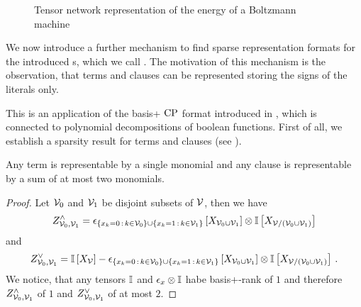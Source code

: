 \begin{figure}[t]
    \begin{center}
        
    \end{center}
    \caption{Tensor network representation of the energy of a Boltzmann machine}
    \label{fig:boltzmannEnergy}
\end{figure}

\subsect{\PolynomialSparsity{}}\label{sec:HLNpolyRepresentation}

We now introduce a further mechanism to find sparse representation formats for the introduced \HybridLogicNetwork{}s, which we call \polynomialSparsity{}.
The motivation of this mechanism is the observation, that terms and clauses can be represented storing the signs of the literals only.

This is an application of the basis+ $\mathrm{CP}$ format introduced in , which is connected to polynomial decompositions of boolean functions.
First of all, we establish a sparsity result for terms and clauses (see ).

\begin{lemma}
    \label{lem:clauseTermBasisPlus}
    Any term is representable by a single monomial and any clause is representable by a sum of at most two monomials. %
\end{lemma}
\begin{proof}
    Let $\mathcal{V}_0$ and $\mathcal{V}_1$ be disjoint subsets of $\mathcal{V}$, then we have
    \begin{align*}
        Z^{\land}_{\mathcal{V}_0,\mathcal{V}_1} = \epsilon_{
            \{x_{k} = 0 \,:\, k\in\mathcal{V}_0\} \cup \{x_{k} = 1 \,:\, k\in\mathcal{V}_1\}
        }\left[X_{\mathcal{V}_0\cup\mathcal{V}_1}\right] \otimes \mathbb{I}\left[X_{\mathcal{V}/(\mathcal{V}_0\cup\mathcal{V}_1)}\right]
    \end{align*}
    and
    \begin{align*}
        Z^{\lor}_{\mathcal{V}_0,\mathcal{V}_1} = \mathbb{I}\left[X_{\mathcal{V}}\right] - \epsilon_{
            \{x_{k} = 0 \,:\, k\in\mathcal{V}_0\} \cup \{x_{k} = 1 \,:\, k\in\mathcal{V}_1\}
        }\left[X_{\mathcal{V}_0\cup\mathcal{V}_1}\right]
        \otimes \mathbb{I}\left[X_{\mathcal{V}/(\mathcal{V}_0\cup\mathcal{V}_1)}\right] \, .
    \end{align*}
    We notice, that any tensors $\mathbb{I}$ and $\epsilon_{x}\otimes \mathbb{I}$ habe basis+-rank of $1$ and therefore $Z^{\land}_{\mathcal{V}_0,\mathcal{V}_1}$ of $1$ and $Z^{\lor}_{\mathcal{V}_0,\mathcal{V}_1}$ of at most $2$.
\end{proof}

